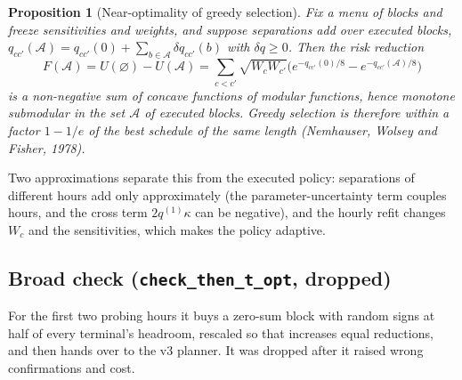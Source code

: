 \documentclass[11pt]{article}
\newtheorem{proposition}{Proposition}
\theoremstyle{definition}
\newcommand{\code}[1]{\texttt{#1}}
\begin{document}
{\begin{proposition}[Near-optimality of greedy selection]\label{prop:sub}
Fix a menu of blocks and freeze sensitivities and weights, and suppose separations add over executed blocks, $q_{cc'}(\mathcal A)=q_{cc'}(0)+\sum_{b\in\mathcal A}\delta q_{cc'}(b)$ with $\delta q\ge0$. Then the risk reduction
\[
  F(\mathcal A)=U(\varnothing)-U(\mathcal A)=\sum_{c<c'}\sqrt{W_cW_{c'}}\Big(e^{-q_{cc'}(0)/8}-e^{-q_{cc'}(\mathcal A)/8}\Big)
\]
is a non-negative sum of concave functions of modular functions, hence monotone submodular in the set $\mathcal A$ of executed blocks. Greedy selection is therefore within a factor $1-1/e$ of the best schedule of the same length (Nemhauser, Wolsey and Fisher, 1978).
\end{proposition}
Two approximations separate this from the executed policy: separations of different hours add only approximately (the parameter-uncertainty term couples hours, and the cross term $2q^{(1)}\kappa$ can be negative), and the hourly refit changes $W_c$ and the sensitivities, which makes the policy adaptive.

\subsection{Broad check (\code{check\_then\_t\_opt}, dropped)}
For the first two probing hours it buys a zero-sum block with random signs at half of every terminal's headroom, rescaled so that increases equal reductions, and then hands over to the v3 planner. It was dropped after it raised wrong confirmations and cost.

}
\end{document}
